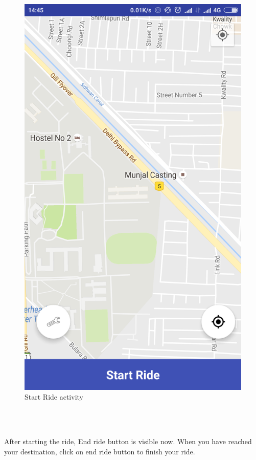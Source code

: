 \begin{figure}[h]
\centering
\includegraphics[width=0.7\linewidth]{p03}
\caption{Start Ride activity}
\end{figure}
\begin{text}
	\\
	\\
\end{text}	
After starting the ride, End ride button is visible now. When you have reached your destination, click on end ride button to finish your ride.

